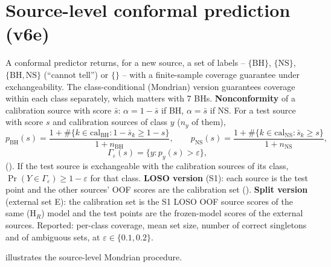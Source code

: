 \section{Source-level conformal prediction (v6e)}\label{sec:conformal}

A conformal predictor returns, for a new source, a set of labels -- $\{\mathrm{BH}\}$, $\{\mathrm{NS}\}$, $\{\mathrm{BH},
\mathrm{NS}\}$ (``cannot tell'') or $\{\}$ -- with a finite-sample coverage guarantee under exchangeability. The
class-conditional (Mondrian) version guarantees coverage within each class separately, which matters with 7 BHs.
\textbf{Nonconformity} of a calibration source with score $\bar s$: $\alpha=1-\bar s$ if BH, $\alpha=\bar s$ if NS.
For a test source with score $s$ and calibration sources of class $y$ ($n_y$ of them),
\begin{equation}
p_\mathrm{BH}(s) = \frac{1+\#\{k\in\mathrm{cal}_\mathrm{BH}: 1-\bar s_k\ge 1-s\}}{1+n_\mathrm{BH}},\qquad
p_\mathrm{NS}(s) = \frac{1+\#\{k\in\mathrm{cal}_\mathrm{NS}: \bar s_k\ge s\}}{1+n_\mathrm{NS}},\label{eq:conformal}
\end{equation}
\begin{equation*}
\Gamma_\varepsilon(s)=\{y: p_y(s)>\varepsilon\},
\end{equation*}
(). If the test source is exchangeable with the calibration sources of its class,
$\Pr(Y\in\Gamma_\varepsilon)\ge1-\varepsilon$ for that class. \textbf{LOSO version} (S1): each source is the test point and
the other sources' OOF scores are the calibration set (). \textbf{Split version} (external set E):
the calibration set is the S1 LOSO OOF source scores of the same (H$_R$) model and the test points are the frozen-model
scores of the external sources. Reported: per-class coverage, mean set size, number of correct singletons and of
ambiguous sets, at $\varepsilon\in\{0.1,0.2\}$.

 illustrates the source-level Mondrian procedure.

